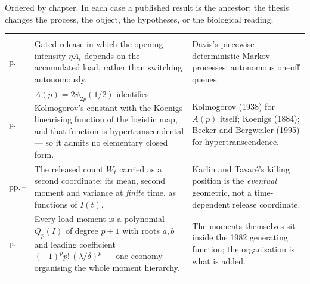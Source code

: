 \clearpage
{}

{\footnotesize\noindent
Ordered by chapter. In each case a published result is the ancestor; the thesis changes
the process, the object, the hypotheses, or the biological reading.\par}

\vspace{0.35\baselineskip}
{\footnotesize
\begin{xltabular}{\linewidth}{@{}>{\raggedright\arraybackslash}p{20mm}O>{\raggedright\arraybackslash}p{40mm}@{}}
\toprule
{} &  &  \\
\midrule
\endfirsthead
\toprule
{} &  &  \\
\midrule
\endhead
\bottomrule
\endlastfoot

\newline p.\,\pageref{m:sec:gated} &
Gated release in which the opening intensity $\eta A_t$ depends on the accumulated load,
rather than switching autonomously. &
Davis's piecewise-deterministic Markov processes; autonomous on--off queues. \\
\addlinespace[3pt]

\newline p.\,\pageref{gw:thm:main} &
$A(p)=2\psi_{2p}(1/2)$ identifies Kolmogorov's constant with the Koenigs linearising
function of the logistic map, and that function is hypertranscendental --- so it admits no
elementary closed form. &
Kolmogorov (1938) for $A(p)$ itself; Koenigs (1884); Becker and Bergweiler (1995) for
hypertranscendence. \\
\addlinespace[3pt]

\newline pp.\,\pageref{bdc:thm:V}--\pageref{bdc:thm:Wsq} &
The released count $W_t$ carried as a second coordinate: its mean, second moment and
variance at \emph{finite} time, as functions of $I(t)$. &
Karlin and Tavar\'e's killing position is the \emph{eventual} geometric, not a
time-dependent release coordinate. \\
\addlinespace[3pt]

\newline p.\,\pageref{bdc:prop:polynomial} &
Every load moment is a polynomial $Q_p(I)$ of degree $p+1$ with roots $a,b$ and leading
coefficient $(-1)^p p!\,(\lambda/\delta)^p$ --- one economy organising the whole moment
hierarchy. &
The moments themselves sit inside the 1982 generating function; the organisation is what
is added. \\
\addlinespace[3pt]


\end{xltabular}}
